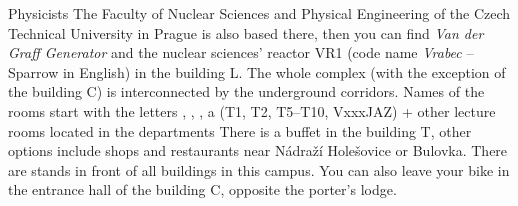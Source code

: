 {Physicists}
{The Faculty of Nuclear Sciences
and Physical Engineering of the Czech Technical University in Prague is also
based there, then you can find \textit{Van der Graff Generator} and the nuclear
sciences' reactor VR1 (code name \textit{Vrabec} -- Sparrow in English) in the
building L. The whole complex (with the exception of the building C) is
interconnected by the underground corridors.}
{Names of the rooms start with the letters , , ,  a
 (T1, T2, T5--T10,
VxxxJAZ) + other lecture rooms located in the departments}
{There is a buffet in the building T, other options include shops and
restaurants near Nádraží Holešovice or Bulovka. }
{There are stands in front of all buildings in this campus. You can also leave
your bike in the entrance hall of the building C, opposite the porter's lodge.}